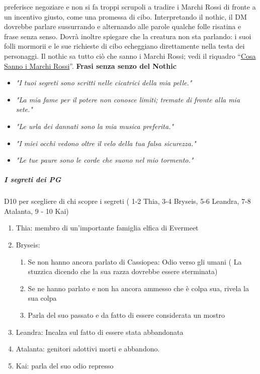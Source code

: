 \documentclass{article}
\begin{document}
\begin{enumerate}
preferisce negoziare e non si fa troppi scrupoli a tradire
i Marchi Rossi di fronte a un incentivo giusto, come una
promessa di cibo. Interpretando il nothic, il DM dovrebbe
parlare sussurrando e alternando alle parole qualche folle
risatina e frase senza senso. Dovrà inoltre spiegare che
la creatura non sta parlando: i suoi folli mormorii e le sue
richieste di cibo echeggiano direttamente nella testa dei
personaggi. Il nothic sa tutto ciò che sanno i Marchi Rossi;
vedi il riquadro “\hyperlink{cosasanno}{Cosa Sanno i Marchi Rossi}”. \newline
\textbf{Frasi senza senzo del Nothic}\\
\begin{itemize}
    \item \textit{"I tuoi segreti sono scritti nelle cicatrici della mia pelle."}
    \item \textit{"La mia fame per il potere non conosce limiti; tremate di fronte alla mia sete."}
    \item \textit{"Le urla dei dannati sono la mia musica preferita."}
    \item \textit{"I miei occhi vedono oltre il velo della tua falsa sicurezza."}
    \item \textit{"Le tue paure sono le corde che suono nel mio tormento."}
    \end{itemize}
\subparagraph{I segreti dei PG}
D10 per scegliere di chi scopre i segreti ( 1-2 Thia, 3-4 Bryseis, 5-6 Leandra, 7-8 Atalanta, 9 - 10 Kai)
\begin{enumerate}
    \item Thia: membro di un'importante famiglia elfica di Evermeet
    \item Bryseis: \begin{enumerate}
        \item Se non hanno ancora parlato di Cassiopea: Odio verso gli umani ( La stuzzica dicendo che la sua razza dovrebbe essere sterminata)
        \item Se ne hanno parlato e non ha ancora ammesso che è colpa sua, rivela la sua colpa
        \item Parla del suo passato e da fatto di essere considerata un mostro
    \end{enumerate}
    \item Leandra: Incalza sul fatto di essere stata abbandonata
    \item Atalanta: genitori adottivi morti e abbandono.
    \item Kai: parla del suo odio represso
\end{enumerate}

\end{enumerate}
\end{document}
